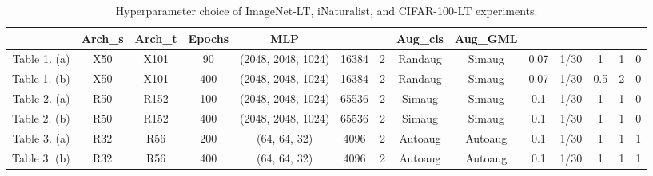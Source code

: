 \documentclass{article}
\theoremstyle{plain}
\theoremstyle{definition}
\theoremstyle{remark}
\begin{document}
\begin{table}[t]
\caption{Hyperparameter choice of ImageNet-LT, iNaturalist, and CIFAR-100-LT experiments.}
\centering
\scriptsize
\begin{tabular}{c|c|c|c|c|c|c|c|c|c|c|c|c|c}
\hline
             & Arch\_s & Arch\_t & Epochs & MLP                &      &  & Aug\_cls & Aug\_GML &  &  &    &  &  \\ \hline
Table 1. (a) & X50     & X101    & 90     & (2048, 2048, 1024) & 16384 & 2    & Randaug  & Simaug   & 0.07 & 1/30 & 1   & 1 & 0 \\ \hline
Table 1. (b) & X50     & X101    & 400    & (2048, 2048, 1024) & 16384 & 2    & Randaug  & Simaug   & 0.07 & 1/30 & 0.5 & 2 & 0 \\ \hline
Table 2. (a) & R50     & R152    & 100    & (2048, 2048, 1024) & 65536 & 2    & Simaug   & Simaug   & 0.1  & 1/30 & 1   & 1 & 0 \\ \hline
Table 2. (b) & R50     & R152    & 400    & (2048, 2048, 1024) & 65536 & 2    & Simaug   & Simaug   & 0.1  & 1/30 & 1   & 1 & 0 \\ \hline
Table 3. (a) & R32     & R56     & 200    & (64, 64, 32)       & 4096  & 2    & Autoaug  & Autoaug  & 0.1  & 1/30 & 1   & 1 & 1 \\ \hline
Table 3. (b) & R32     & R56     & 400    & (64, 64, 32)       & 4096  & 2    & Autoaug  & Autoaug  & 0.1  & 1/30 & 1   & 1 & 1 \\ \hline
\end{tabular} \label{tab:implementation}
\end{table}
 
\end{document}
